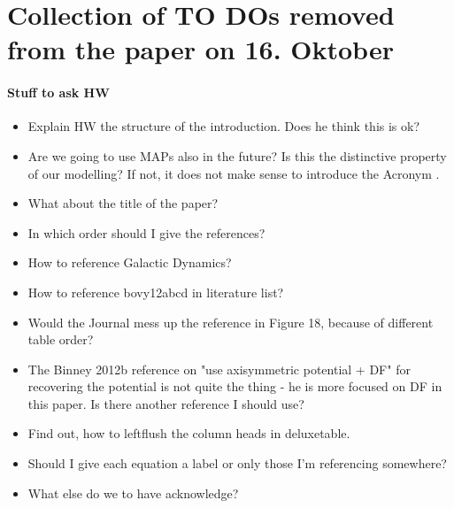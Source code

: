 \section{Collection of TO DOs removed from the paper on 16. Oktober}

\paragraph{Stuff to ask HW}
\begin{itemize}
\item Explain HW the structure of the introduction. Does he think this is ok?
\item Are we going to use MAPs also in the future? Is this the distinctive property of our modelling? If not, it does not make sense to introduce the Acronym \RM{}.
\item What about the title of the paper?
\item In which order should I give the references?
\item How to reference Galactic Dynamics?
\item How to reference bovy12abcd in literature list?
\item Would the Journal mess up the reference in Figure 18, because of different table order?
\item The Binney 2012b reference on "use axisymmetric potential + DF" for recovering the potential is not quite the thing - he is more focused on DF in this paper. Is there another reference I should use?
\item Find out, how to leftflush the column heads in deluxetable.
\item Should I give each equation a label or only those I'm referencing somewhere?
\item What else do we to have acknowledge?
\end{itemize}

